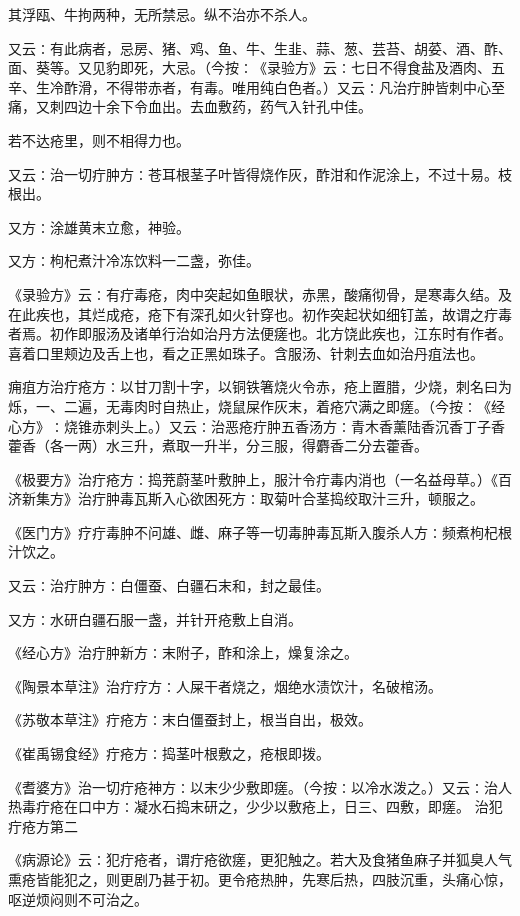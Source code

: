 \documentclass[a4paper,12pt,UTF8,twoside]{ctexbook}
\begin{document}
其浮瓯、牛拘两种，无所禁忌。纵不治亦不杀人。

又云∶有此病者，忌房、猪、鸡、鱼、牛、生韭、蒜、葱、芸苔、胡荽、酒、酢、面、葵等。又见豹即死，大忌。（今按∶《录验方》云∶七日不得食盐及酒肉、五辛、生冷酢滑，不得带赤者，有毒。唯用纯白色者。）又云∶凡治疔肿皆刺中心至痛，又刺四边十余下令血出。去血敷药，药气入针孔中佳。

若不达疮里，则不相得力也。

又云∶治一切疔肿方∶苍耳根茎子叶皆得烧作灰，酢泔和作泥涂上，不过十易。枝根出。

又方∶涂雄黄末立愈，神验。

又方∶枸杞煮汁冷冻饮料一二盏，弥佳。

《录验方》云∶有疔毒疮，肉中突起如鱼眼状，赤黑，酸痛彻骨，是寒毒久结。及在此疾也，其烂成疮，疮下有深孔如火针穿也。初作突起状如细钉盖，故谓之疔毒者焉。初作即服汤及诸单行治如治丹方法便瘥也。北方饶此疾也，江东时有作者。喜着口里颊边及舌上也，看之正黑如珠子。含服汤、针刺去血如治丹疽法也。

痈疽方治疔疮方∶以甘刀割十字，以铜铁箸烧火令赤，疮上置腊，少烧，刺名曰为烁，一、二遍，无毒肉时自热止，烧鼠屎作灰末，着疮穴满之即瘥。（今按∶《经心方》∶烧锥赤刺头上。）又云∶治恶疮疔肿五香汤方∶青木香薰陆香沉香丁子香藿香（各一两）水三升，煮取一升半，分三服，得麝香二分去藿香。

《极要方》治疔疮方∶捣茺蔚茎叶敷肿上，服汁令疔毒内消也（一名益母草。）《百济新集方》治疔肿毒瓦斯入心欲困死方∶取菊叶合茎捣绞取汁三升，顿服之。

《医门方》疗疔毒肿不问雄、雌、麻子等一切毒肿毒瓦斯入腹杀人方∶频煮枸杞根汁饮之。

又云∶治疔肿方∶白僵蚕、白疆石末和，封之最佳。

又方∶水研白疆石服一盏，并针开疮敷上自消。

《经心方》治疔肿新方∶末附子，酢和涂上，燥复涂之。

《陶景本草注》治疔疗方∶人屎干者烧之，烟绝水渍饮汁，名破棺汤。

《苏敬本草注》疔疮方∶末白僵蚕封上，根当自出，极效。

《崔禹锡食经》疔疮方∶捣茎叶根敷之，疮根即拨。

《耆婆方》治一切疔疮神方∶以末少少敷即瘥。（今按∶以冷水泼之。）又云∶治人热毒疔疮在口中方∶凝水石捣末研之，少少以敷疮上，日三、四敷，即瘥。
治犯疔疮方第二

《病源论》云∶犯疔疮者，谓疔疮欲瘥，更犯触之。若大及食猪鱼麻子并狐臭人气熏疮皆能犯之，则更剧乃甚于初。更令疮热肿，先寒后热，四肢沉重，头痛心惊，呕逆烦闷则不可治之。
\end{document}
